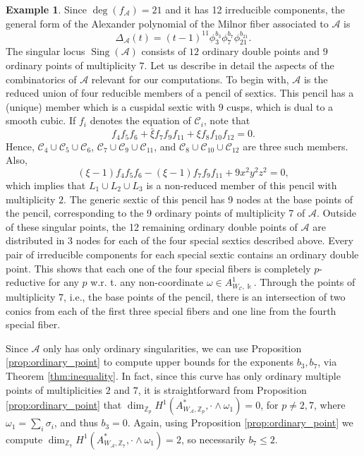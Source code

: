 \documentclass[11pt]{amsart}
\DeclareMathOperator{\Sing}{Sing}
\def\cC{\mathcal{C}}
\def\cA{{\mathcal A}}
\def\kk{\Bbbk}
\def\w{\omega}
\theoremstyle{plain}
\theoremstyle{definition}
\newtheorem{example}[thm]{Example}
\begin{document}
\begin{example}
Since $\deg(f_\mathcal{A})=21$ and it has 12 irreducible components, the general form of the Alexander polynomial of the Milnor fiber associated to $\mathcal{A}$ is 
$$
 \Delta_{\mathcal{A}}(t) = (t-1)^{11}\phi_3^{b_3}\phi_7^{b_7}\phi_{21}^{b_{21}}.
 $$
The singular locus $\Sing(\mathcal{A})$ consists of $12$ ordinary double points and $9$ ordinary points of multiplicity $7$.
 Let us describe in detail the aspects of the combinatorics of $\mathcal{A}$ relevant for our computations. To begin with, $\mathcal{A}$ is the reduced union of four reducible members of a pencil of sextics. This pencil has a (unique) member which is a cuspidal sextic with $9$ cusps, which is dual to a smooth cubic.  
 If $f_i$ denotes the equation of $\cC_i$, note that $$f_4f_5f_6+\bar\xi f_7f_9f_{11}+\xi f_8f_{10}f_{12}=0.$$ Hence, $\cC_4 \cup \cC_5 \cup \cC_6$, $\cC_7 \cup \cC_9 \cup \cC_{11}$, and $\cC_8 \cup \cC_{10} \cup\cC_{12}$ are three such members. Also, $$(\xi-1)f_4f_5f_6-(\xi-1)f_7f_9f_{11} +9x^2y^2z^2=0,$$ which implies that $L_1\cup L_2\cup L_3$ is a non-reduced member of this pencil with multiplicity $2$. 
 The generic sextic of this pencil has 9 nodes at the base points of the pencil, corresponding to the 9 ordinary points of multiplicity 7 of $\cA$. Outside of these singular points, the 12 remaining ordinary double points of $\cA$ are distributed in 3 nodes for each of the four special sextics described above. Every pair of irreducible components for each special sextic contains an ordinary double point. This shows that each one of the four special fibers is completely $p$-reductive for any $p$ w.r. t. any non-coordinate $\w\in A^1_{W_\cC,\kk}$. 
 Through the points of multiplicity $7$, i.e., the base points of the pencil, there is an intersection of two conics from each of the first three special fibers and one line from the fourth special fiber.
 
 Since $\cA$ only has only ordinary singularities, we can use Proposition \ref{prop:ordinary_point} to compute upper bounds for the exponents $b_3, b_7$, via Theorem \ref{thm:inequality}. In fact, since this curve has only ordinary multiple points of multiplicities $2$ and $7$, it is straightforward from Proposition \ref{prop:ordinary_point} that $\dim_{\mathbb{Z}_p} H^1(A^*_{W_{\mathcal{A}},\mathbb{Z}_p},\cdot\wedge\w_1)=0$, for $p\neq 2,7$, where $\w_1 = \sum_i \sigma_i$, 
 and thus $b_3=0$. Again, using Proposition \ref{prop:ordinary_point} we compute $\dim_{\mathbb{Z}_7} H^1(A^*_{W_{\mathcal{A}},\mathbb{Z}_7},\cdot\wedge\w_1)=2$, so necessarily $b_7 \leq 2$.%
 

\end{example}
\end{document}
